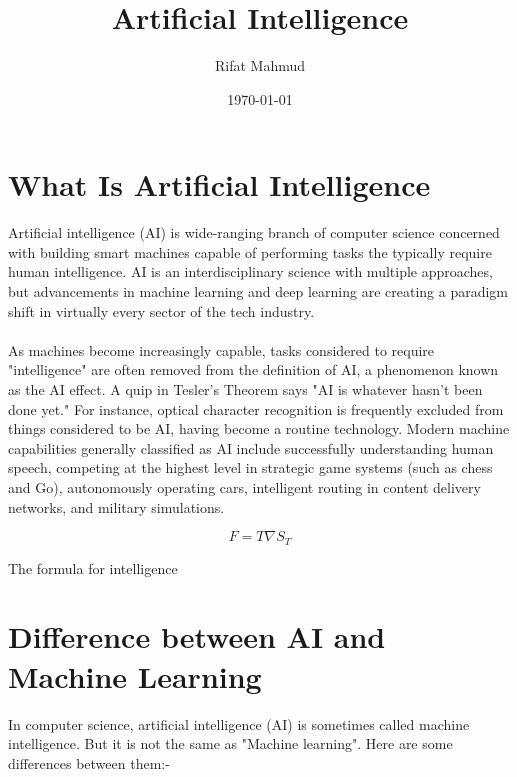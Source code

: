 \documentclass[a4paper, 12pt]{article}
\begin{document}
\title{\Large{\textbf{Artificial Intelligence}}}
\author{Rifat Mahmud}
\date{\today}
\maketitle

\tableofcontents

\section{What Is Artificial Intelligence}
Artificial intelligence (AI) is wide-ranging branch of computer science concerned with building smart machines capable of performing tasks the typically require human intelligence. AI is an interdisciplinary science with multiple approaches, but advancements in machine learning and deep learning are creating a paradigm shift in virtually every sector of the tech industry.\\ \\
As machines become increasingly capable, tasks considered to require "intelligence" are often removed from the definition of AI, a phenomenon known as the AI effect. A quip in Tesler's Theorem says "AI is whatever hasn't been done yet." For instance, optical character recognition is frequently excluded from things considered to be AI, having become a routine technology. Modern machine capabilities generally classified as AI include successfully understanding human speech, competing at the highest level in strategic game systems (such as chess and Go), autonomously operating cars, intelligent routing in content delivery networks, and military simulations.

$$F = T \nabla S_T$$
\begin{center} The formula for intelligence \end{center}

\section{Difference between AI and Machine Learning}
In computer science, artificial intelligence (AI) is sometimes called machine intelligence. But it is not the same as "Machine learning". Here are some differences between them:-
\end{document}
